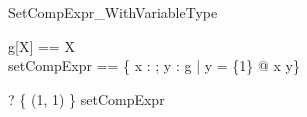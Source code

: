 \begin{zsection}
  \SECTION SetCompExpr\_WithVariableType
\end{zsection}

\begin{zed}
  g[X] == X\\
  setCompExpr == \{ x : \power \nat; y : \power g |
                        y = \{1\} @ x \cross y\}
\end{zed}

\begin{zed}
  \vdash? \{ (1, 1) \} \in setCompExpr
\end{zed}
